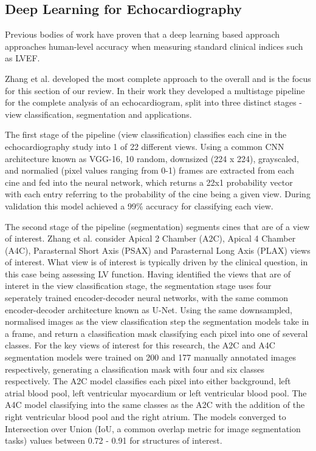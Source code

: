 \subsection{Deep Learning for Echocardiography}

Previous bodies of work \cite{zhangFullyAutomatedEchocardiogram2018}
\cite{leclercDeepLearningSegmentation2019} \cite{hewitt2019artificial} have
proven that a deep learning based approach approaches human-level accuracy when
measuring standard clinical indices such as LVEF. \newline

Zhang et al. developed the most complete approach to the overall and is the
focus for this section of our review. In their work they developed a multistage
pipeline for the complete analysis of an echocardiogram, split into three
distinct stages - view classification, segmentation and applications. \newline

The first stage of the pipeline (view classification) classifies each cine in
the echocardiography study into 1 of 22 different views. Using a common CNN
architecture known as VGG-16, 10 random, downsized (224 x 224), grayscaled, and
normalied (pixel values ranging from 0-1) frames are extracted from each cine
and fed into the neural network, which returns a 22x1 probability
vector with each entry referring to the probability of the cine being a given
view. During validation this model achieved a 99\% accuracy for classifying each
view.
\newline

The second stage of the pipeline (segmentation) segments cines that are of a
view of interest. Zhang et al. consider Apical 2 Chamber (A2C), Apical 4 Chamber
(A4C), Parasternal Short Axis (PSAX) and Parasternal Long Axis (PLAX) views of
interest. What view is of interest is typically driven by the clinical question,
in this case being assessing LV function. Having identified the views that are
of interet in the view classification stage, the segmentation stage uses four
seperately trained encoder-decoder neural networks, with the same common
encoder-decoder architecture known as U-Net. Using the same downsampled,
normalised images as the view classification step the segmentation models take
in a frame, and return a classification mask classifying each pixel into one of
several classes. For the key views of interest for this research, the A2C and
A4C segmentation models were trained on 200 and 177 manually annotated images
respectively, generating a classification mask with four and six classes
respectively. The A2C model classifies each pixel into either background, left atrial
blood pool, left ventricular myocardium or left ventricular blood pool. The
A4C model classifying into the same classes as the A2C with the addition of the
right ventricular blood pool and the right atrium. The models converged to
Intersection over Union (IoU, a common overlap metric for image segmentation
tasks) values between 0.72 - 0.91 for structures of interest. \newline

